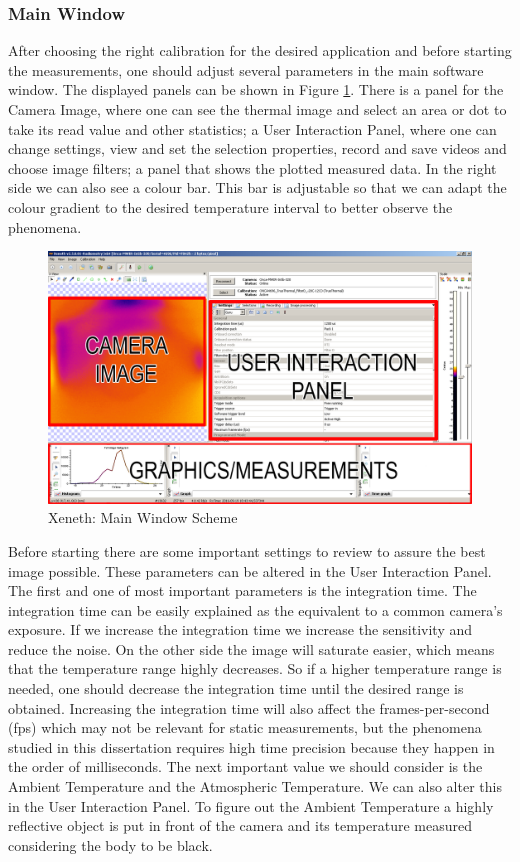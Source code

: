 \subsubsection{Main Window}
\label{software}
\par After choosing the right calibration for the desired application and before starting the measurements, one should adjust several parameters in the main software window. The displayed panels can be shown in Figure \ref{fig:xeneth2}. There is a panel for the Camera Image, where one can see the thermal image and select an area or dot to take its read value and other statistics; a User Interaction Panel, where one can change settings, view and set the selection properties, record and save videos and choose image filters; a panel that shows the plotted measured data. In the right side we can also see a colour bar. This bar is adjustable so that we can adapt the colour gradient to the desired temperature interval to better observe the phenomena. \\
\begin{figure}[h]
\centering
\includegraphics[width=0.7\linewidth]{Figures/3.Chapter/xeneth2.png}
\caption{Xeneth: Main Window Scheme}
\label{fig:xeneth2}
\end{figure}
\par Before starting there are some important settings to review to assure the best image possible. These parameters can be altered in the User Interaction Panel. The first and one of most important parameters is the integration time. The integration time can be easily explained as the equivalent to a common camera's exposure. If we increase the integration time we increase the sensitivity and reduce the noise. On the other side the image will saturate easier, which means that the temperature range highly decreases. So if a higher temperature range is needed, one should decrease the integration time until the desired range is obtained. Increasing the integration time will also affect the frames-per-second (fps) which may not be relevant for static measurements, but the phenomena studied in this dissertation requires high time precision because they happen in the order of milliseconds. The next important value we should consider is the Ambient Temperature and the Atmospheric Temperature. We can also alter this in the User Interaction Panel. To figure out the Ambient Temperature a highly reflective object is put in front of the camera and its temperature measured considering the body to be black. \\
